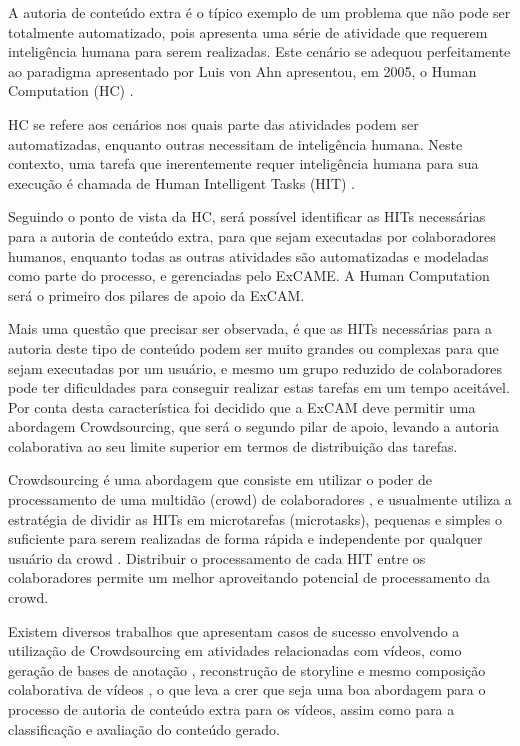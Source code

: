 \documentclass{sig-alternate}
\begin{document}
\par A autoria de conteúdo extra é o típico exemplo de um problema que não pode ser totalmente automatizado, pois apresenta uma série de atividade que requerem inteligência humana para serem realizadas. Este cenário se adequou perfeitamente ao paradigma apresentado por Luis von Ahn apresentou, em 2005, o Human Computation (HC) \cite{VonAhn:2005:HC:1168246}.

HC se refere aos cenários nos quais parte das atividades podem ser automatizadas, enquanto outras necessitam de inteligência humana. Neste contexto, uma tarefa que inerentemente requer inteligência humana para sua execução é chamada de Human Intelligent Tasks (HIT) \cite{Mo:2013:OPH:2505515.2505755}.

Seguindo o ponto de vista da HC, será possível identificar as HITs necessárias para a autoria de conteúdo extra, para que sejam executadas por colaboradores humanos, enquanto todas as outras atividades são automatizadas e modeladas como parte do processo, e gerenciadas pelo ExCAME. A Human Computation será o primeiro dos pilares de apoio da ExCAM.
 
Mais uma questão que precisar ser observada, é que as HITs necessárias para a autoria deste tipo de conteúdo podem ser muito grandes ou complexas para que sejam executadas por um usuário, e mesmo um grupo reduzido de colaboradores pode ter dificuldades para conseguir realizar estas tarefas em um tempo aceitável. Por conta desta característica foi decidido que a ExCAM deve permitir uma abordagem Crowdsourcing, que será o segundo pilar de apoio, levando a autoria colaborativa ao seu limite superior em termos de distribuição das tarefas.

Crowdsourcing é uma abordagem que consiste em utilizar o poder de processamento de uma multidão (crowd) de colaboradores \cite{Howe2006}, e usualmente utiliza a estratégia de dividir as HITs em microtarefas (microtasks), pequenas e simples o suficiente para serem realizadas de forma rápida e independente por qualquer usuário da crowd \cite{Difallah:2015:DMC:2736277.2741685}. Distribuir o processamento de cada HIT entre os colaboradores permite um melhor aproveitando potencial de processamento da crowd.

Existem diversos trabalhos que apresentam casos de sucesso envolvendo a utilização de Crowdsourcing em atividades relacionadas com vídeos, como geração de  bases de anotação \cite{DiSalvo:2013:CAS:2501105.2501113}, reconstrução de storyline \cite{Kim:2014:JSL:2679600.2680027} e mesmo composição colaborativa de vídeos \cite{Wilk:2015:VCC:2713168.2713178}, o que leva a crer que seja uma boa abordagem para o processo de autoria de conteúdo extra para os vídeos, assim como para a classificação e avaliação do conteúdo gerado.
\end{document}
